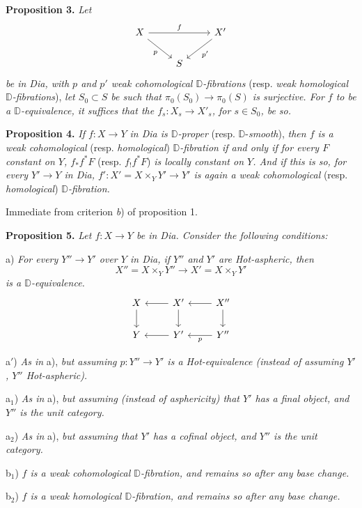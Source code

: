 \documentclass[11pt]{article}
\newcommand{\printedpage}[1]{\marginpar{\footnotesize p.~#1}}
\newcommand{\msp}[1]{\marginpar{\footnotesize [#1]}}
\newcommand{\D}{\mathbb{D}}
\newcommand{\sfup}[1]{\textsf{\upshape #1}}
\newcommand{\Dia}{\sfup{Dia}}
\newcommand{\Hot}{\sfup{Hot}}
\begin{document}
\printedpage{69}

\textbf{Proposition 3.} \textit{Let}
\[
\begin{tikzcd}
X \arrow[rr, "f"] \arrow[dr, "p"'] & & X' \arrow[dl, "p'"] \\
& S &
\end{tikzcd}
\]
\textit{be in \Dia, with $p$ and $p'$ weak cohomological $\D$-fibrations} (resp. \textit{weak homological $\D$-fibrations}), \textit{let $S_0 \subset S$ be such that $\pi_0(S_0) \to \pi_0(S)$ is surjective. For $f$ to be a $\D$-equivalence, it suffices that the $f_s : X_s \to X'_s$, for $s \in S_0$, be so.}

\textbf{Proposition 4.} \textit{If $f : X \to Y$ in \Dia{} is $\D$-proper} (resp. $\D$-\textit{smooth}), \textit{then $f$ is a weak cohomological} (resp. \textit{homological}) \textit{$\D$-fibration if and only if for every $F$ constant on $Y$, $f_*f^*F$} (resp. $f_!f^*F$) \textit{is locally constant on $Y$. And if this is so, for every $Y' \to Y$ in \Dia, $f' : X' = X \times_Y Y' \to Y'$ is again a weak cohomological} (resp. \textit{homological}) \textit{$\D$-fibration.}

Immediate from criterion \textit{b}) of proposition 1.

\msp{page 117}\textbf{Proposition 5.} \textit{Let $f : X \to Y$ be in \Dia. Consider the following conditions:}

a) \textit{For every $Y'' \to Y'$ over $Y$ in \Dia, if $Y''$ and $Y'$ are \Hot-aspheric, then}
\[
X'' = X \times_Y Y'' \longrightarrow X' = X \times_Y Y'
\]
\textit{is a $\D$-equivalence.}
\[
\begin{tikzcd}
X & X' \arrow[l] & X'' \arrow[l] \\
Y \arrow[from=u] & Y' \arrow[l] \arrow[from=u] & Y'' \arrow[l, "p"] \arrow[from=u]
\end{tikzcd}
\]

a$'$) \textit{As in} a), \textit{but assuming $p : Y'' \to Y'$ is a \Hot-equivalence (instead of assuming $Y'$, $Y''$ \Hot-aspheric).}

a$_1$) \textit{As in} a), \textit{but assuming (instead of asphericity) that $Y'$ has a final object, and $Y''$ is the unit category.}

a$_2$) \textit{As in} a), \textit{but assuming that $Y'$ has a cofinal object, and $Y''$ is the unit category.}

b$_1$) \textit{$f$ is a weak cohomological $\D$-fibration, and remains so after any base change.}

b$_2$) \textit{$f$ is a weak homological $\D$-fibration, and remains so after any base change.}
\end{document}
